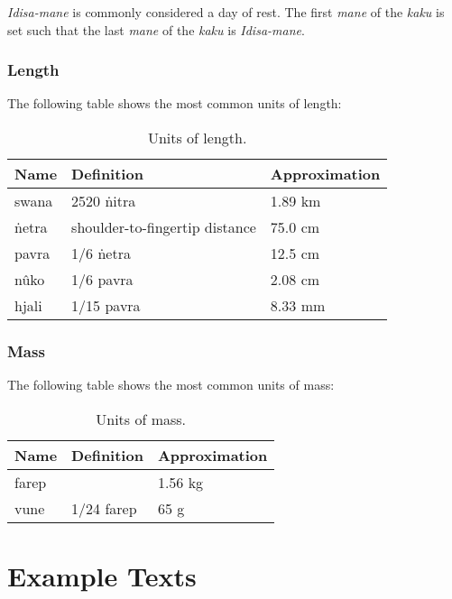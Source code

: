 \documentclass{book}
\begin{document}
\emph{Idisa-mane} is commonly considered a day of rest. The first \emph{mane} of the \emph{kaku} is set such that the last \emph{mane} of the \emph{kaku} is \emph{Idisa-mane}.

\newpage
\subsection{Length}

The following table shows the most common units of length:

\begin{table}[h]
    \caption{Units of length.}
    \centering
    \begin{tabu} to \linewidth {|l|X|X|}
        \hline
        Name & Definition & Approximation \\
        \hline
        swana & 2520 ṅitra & 1.89 km \\
        ṅetra & shoulder-to-fingertip distance & 75.0 cm \\
        pavra & 1/6 ṅetra & 12.5 cm \\
        nûko & 1/6 pavra & 2.08 cm \\
        hjali & 1/15 pavra & 8.33 mm \\
        \hline
    \end{tabu}
\end{table}

\subsection{Mass}

The following table shows the most common units of mass:

\begin{table}[h]
    \caption{Units of mass.}
    \centering
    \begin{tabu} to \linewidth {|l|X|X|}
        \hline
        Name & Definition & Approximation \\
        \hline
        farep & & 1.56 kg \\
        vune & 1/24 farep & 65 g \\
        \hline
    \end{tabu}
\end{table}


\chapter{Example Texts}
\end{document}
